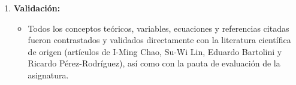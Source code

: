 \documentclass[letter, 10pt]{article}
\begin{document}
\begin{enumerate}
    \item \textbf{Validaci\'on:} 
    \begin{itemize}
        \item Todos los conceptos te\'oricos, variables, ecuaciones y referencias citadas fueron contrastados y validados directamente con la literatura cient\'ifica de origen (art\'iculos de I-Ming Chao, Su-Wi Lin, Eduardo Bartolini y Ricardo P\'erez-Rodr\'iguez), as\'i como con la pauta de evaluaci\'on de la asignatura.
    \end{itemize}
\end{enumerate}



\end{document}
